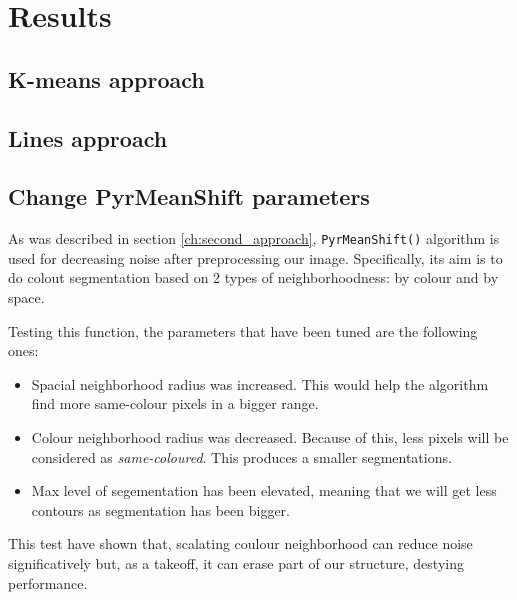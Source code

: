 \documentclass[12pt, a4paper]{article}
\begin{document}
\section{Results}

\subsection{K-means approach}

\subsection{Lines approach}




\subsection{Change PyrMeanShift parameters}

As was described in section \ref{ch:second_approach}, \verb|PyrMeanShift()| algorithm
is used for decreasing noise after preprocessing our image. Specifically, its
aim is to do colout segmentation based on 2 types of neighborhoodness: by colour
and by space. 

Testing this function, the parameters that have been tuned are the following 
ones: 

\begin{itemize}
    
    \item  Spacial neighborhood radius was increased. This would help the algorithm
    find more same-colour pixels in a bigger range. 
    
    \item Colour neighborhood radius was decreased. Because of this, less pixels 
    will be considered as \textit{same-coloured}. This produces a smaller segmentations.

    \item Max level of segementation has been elevated, meaning that we will get 
    less contours as segmentation has been bigger.

\end{itemize}


This test have shown that, scalating coulour neighborhood can reduce noise significatively 
but, as a takeoff, it can erase part of our structure, destying performance.


\end{document}
